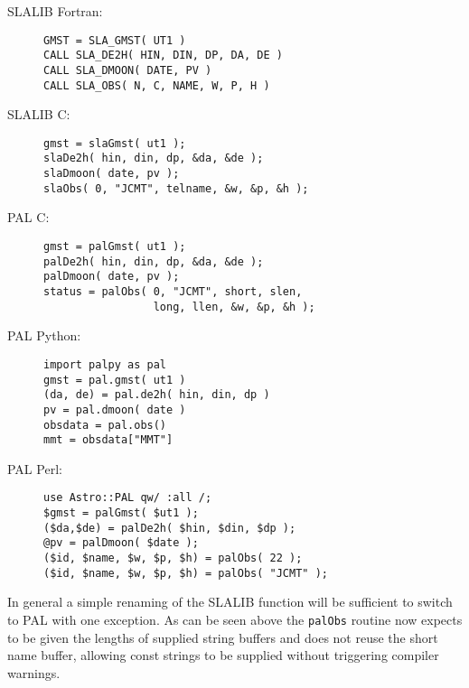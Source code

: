 \newpage
\begin{description}

\item[SLALIB Fortran:] \mbox{}

\begin{verbatim}
GMST = SLA_GMST( UT1 )
CALL SLA_DE2H( HIN, DIN, DP, DA, DE )
CALL SLA_DMOON( DATE, PV )
CALL SLA_OBS( N, C, NAME, W, P, H )
\end{verbatim}

\item[SLALIB C:] \mbox{}

\begin{verbatim}
gmst = slaGmst( ut1 );
slaDe2h( hin, din, dp, &da, &de );
slaDmoon( date, pv );
slaObs( 0, "JCMT", telname, &w, &p, &h );
\end{verbatim}

\item[PAL C:] \mbox{}

\begin{verbatim}
gmst = palGmst( ut1 );
palDe2h( hin, din, dp, &da, &de );
palDmoon( date, pv );
status = palObs( 0, "JCMT", short, slen,
                 long, llen, &w, &p, &h );
\end{verbatim}

\item[PAL Python:] \mbox{}

\begin{verbatim}
import palpy as pal
gmst = pal.gmst( ut1 )
(da, de) = pal.de2h( hin, din, dp )
pv = pal.dmoon( date )
obsdata = pal.obs()
mmt = obsdata["MMT"]
\end{verbatim}

\item[PAL Perl:] \mbox{}

\begin{verbatim}
use Astro::PAL qw/ :all /;
$gmst = palGmst( $ut1 );
($da,$de) = palDe2h( $hin, $din, $dp );
@pv = palDmoon( $date );
($id, $name, $w, $p, $h) = palObs( 22 );
($id, $name, $w, $p, $h) = palObs( "JCMT" );

\end{verbatim}

\end{description}

In general a simple renaming of the SLALIB function will be sufficient to switch to PAL with one exception. As can be seen above the \texttt{palObs} routine now expects to be given the lengths of supplied string buffers and does not reuse the short name buffer, allowing const strings to be supplied without triggering compiler warnings.

